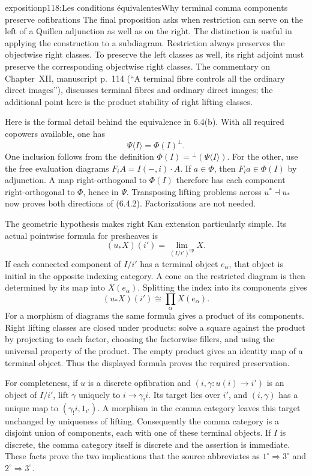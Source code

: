 \begin{dcomment}{exposition}{p118:Les conditions équivalentes}{Why terminal comma components preserve cofibrations}
The final proposition asks when restriction can serve on the left of a Quillen adjunction as well as on the right. The distinction is useful in applying the construction to a subdiagram. Restriction always preserves the objectwise right classes. To preserve the left classes as well, its right adjoint must preserve the corresponding objectwise right classes. The commentary on Chapter~XII, manuscript p.~114 (``A terminal fibre controls all the ordinary direct images''), discusses terminal fibres and ordinary direct images; the additional point here is the product stability of right lifting classes.

Here is the formal detail behind the equivalence in 6.4(b). With all required copowers available, one has
\[
 \Psi\langle I\rangle=\Phi(I)^\perp.
\]
One inclusion follows from the definition $\Phi(I)={}^\perp(\Psi\langle I\rangle)$. For the other, use the free evaluation diagrams $F_iA=I(-,i)\cdot A$. If $a\in\Phi$, then $F_ia\in\Phi(I)$ by adjunction. A map right-orthogonal to $\Phi(I)$ therefore has each component right-orthogonal to $\Phi$, hence in $\Psi$. Transposing lifting problems across $u^*\dashv u_*$ now proves both directions of (6.4.2). Factorizations are not needed.

The geometric hypothesis makes right Kan extension particularly simple. Its actual pointwise formula for presheaves is
\[
 (u_*X)(i')=\lim_{(I/i')^{\mathrm{op}}}X.
\]
If each connected component of $I/i'$ has a terminal object $e_\alpha$, that object is initial in the opposite indexing category. A cone on the restricted diagram is then determined by its map into $X(e_\alpha)$. Splitting the index into its components gives
\[
 (u_*X)(i')\cong\prod_\alpha X(e_\alpha).
\]
For a morphism of diagrams the same formula gives a product of its components. Right lifting classes are closed under products: solve a square against the product by projecting to each factor, choosing the factorwise fillers, and using the universal property of the product. The empty product gives an identity map of a terminal object. Thus the displayed formula proves the required preservation.

For completeness, if $u$ is a discrete opfibration and $(i,\gamma:u(i)\to i')$ is an object of $I/i'$, lift $\gamma$ uniquely to $i\to\gamma_!i$. Its target lies over $i'$, and $(i,\gamma)$ has a unique map to $(\gamma_!i,1_{i'})$. A morphism in the comma category leaves this target unchanged by uniqueness of lifting. Consequently the comma category is a disjoint union of components, each with one of these terminal objects. If $I$ is discrete, the comma category itself is discrete and the assertion is immediate. These facts prove the two implications that the source abbreviates as $1^\circ\Rightarrow3^\circ$ and $2^\circ\Rightarrow3^\circ$.
\end{dcomment}

